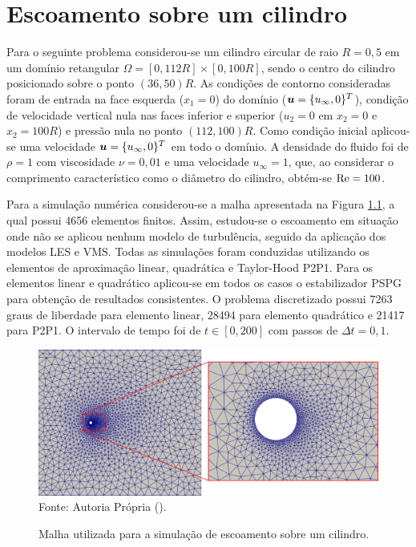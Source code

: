 \chapter[APÊNDICE \ref{Ap:cylinder}]{Escoamento sobre um cilindro}
\label{Ap:cylinder}

Para o seguinte problema considerou-se um cilindro circular de raio $R=0,5$ em um domínio retangular $\Omega=[0,112R]\times[0,100R]$, sendo o centro do cilindro posicionado sobre o ponto $(36,50)R$. As condições de contorno consideradas foram de entrada na face esquerda ($x_1=0$) do domínio ($\boldsymbol{u}=\{u_\infty,0\}^T$), condição de velocidade vertical nula nas faces inferior e superior ($u_2=0$ em $x_2=0$ e $x_2=100R$) e pressão nula no ponto $(112,100)R$. Como condição inicial aplicou-se uma velocidade $\boldsymbol{u}=\{u_\infty,0\}^T$ em todo o domínio. A densidade do fluido foi de $\rho=1$ com viscosidade $\nu=0,01$ e uma velocidade $u_\infty=1$, que, ao considerar o comprimento característico como o diâmetro do cilindro, obtém-se $\mathrm{Re}=100$.

Para a simulação numérica considerou-se a malha apresentada na Figura \ref{fig:cyl-mesh}, a qual possui 4656 elementos finitos. Assim, estudou-se o escoamento em situação onde não se aplicou nenhum modelo de turbulência, seguido da aplicação dos modelos LES e VMS. Todas as simulações foram conduzidas utilizando os elementos de aproximação linear, quadrática e Taylor-Hood P2P1. Para os elementos linear e quadrático aplicou-se em todos os casos o estabilizador PSPG para obtenção de resultados consistentes. O problema discretizado possui 7263 graus de liberdade para elemento linear, 28494 para elemento quadrático e 21417 para P2P1. O intervalo de tempo foi de $t\in[0,200]$ com passos de $\Delta t=0,1$.

\begin{figure}[h!]
    \centering
    \caption{Malha utilizada para a simulação de escoamento sobre um cilindro.}
    \includegraphics[width=\linewidth]{Figuras/cylinder/analise2/mesh.png}
    \\Fonte: Autoria Própria (\the\year).
    \label{fig:cyl-mesh}
\end{figure}


